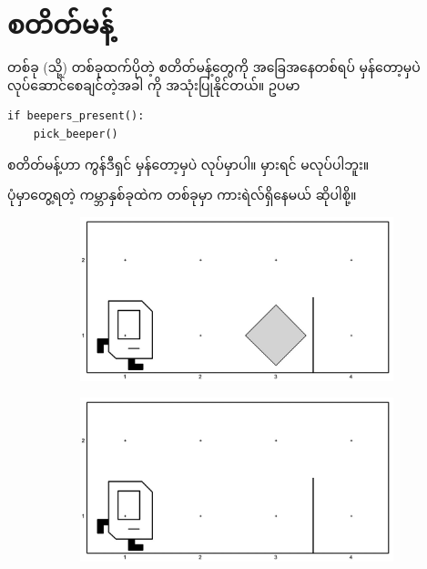 \section{ စတိတ်မန့်}
တစ်ခု (သို့) တစ်ခုထက်ပိုတဲ့ စတိတ်မန့်တွေကို အခြေအနေတစ်ရပ် မှန်တော့မှပဲ လုပ်ဆောင်စေချင်တဲ့အခါ  ကို အသုံးပြုနိုင်တယ်။ ဥပမာ
%
\setlength{\fboxsep}{0pt}
\begin{verbatim}
if beepers_present():
    pick_beeper()
\end{verbatim}
%
 စတိတ်မန့်ဟာ  ကွန်ဒီရှင် မှန်တော့မှပဲ  လုပ်မှာပါ။ မှားရင် မလုပ်ပါဘူး။

ပုံမှာတွေ့ရတဲ့ ကမ္ဘာနှစ်ခုထဲက တစ်ခုမှာ ကားရဲလ်ရှိနေမယ် ဆိုပါစို့။
%
\begin{figure}[tbh!]
    \newcommand{\figpctw}{0.5}
    \newcommand{\figscale}{0.14}
    \begin{subfigure}[t]{{\figpctw}\textwidth}
        \includegraphics[scale=\figscale]{images/ch02/move_beeper_to_other_side_if_any/init1.jpg}
        \caption{}     
    \end{subfigure}
    \begin{subfigure}[t]{{\figpctw}\textwidth}
        \includegraphics[scale=\figscale]{images/ch02/move_beeper_to_other_side_if_any/init2.jpg}
        \caption{}    
    \end{subfigure}  
    \caption{}
    \label{fig:mbtos_if_any}
\end{figure}
